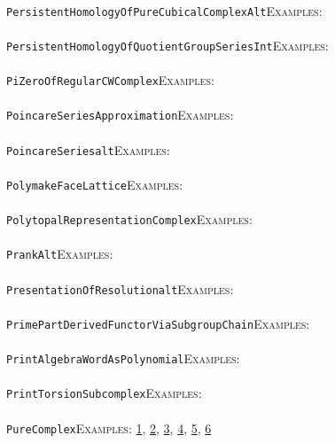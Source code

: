 \documentclass[a4paper,11pt]{report}
\begin{document}
{{ \\
 \texttt{PersistentHomologyOfPureCubicalComplex{\textunderscore}Alt}{\nobreakspace}{\nobreakspace}{\nobreakspace}{\nobreakspace}\textsc{Examples:} \\
 \\
 \texttt{PersistentHomologyOfQuotientGroupSeries{\textunderscore}Int}{\nobreakspace}{\nobreakspace}{\nobreakspace}{\nobreakspace}\textsc{Examples:} \\
 \\
 \texttt{PiZeroOfRegularCWComplex}{\nobreakspace}{\nobreakspace}{\nobreakspace}{\nobreakspace}\textsc{Examples:} \\
 \\
 \texttt{PoincareSeriesApproximation}{\nobreakspace}{\nobreakspace}{\nobreakspace}{\nobreakspace}\textsc{Examples:} \\
 \\
 \texttt{PoincareSeries{\textunderscore}alt}{\nobreakspace}{\nobreakspace}{\nobreakspace}{\nobreakspace}\textsc{Examples:} \\
 \\
 \texttt{PolymakeFaceLattice}{\nobreakspace}{\nobreakspace}{\nobreakspace}{\nobreakspace}\textsc{Examples:} \\
 \\
 \texttt{PolytopalRepresentationComplex}{\nobreakspace}{\nobreakspace}{\nobreakspace}{\nobreakspace}\textsc{Examples:} \\
 \\
 \texttt{PrankAlt}{\nobreakspace}{\nobreakspace}{\nobreakspace}{\nobreakspace}\textsc{Examples:} \\
 \\
 \texttt{PresentationOfResolution{\textunderscore}alt}{\nobreakspace}{\nobreakspace}{\nobreakspace}{\nobreakspace}\textsc{Examples:} \\
 \\
 \texttt{PrimePartDerivedFunctorViaSubgroupChain}{\nobreakspace}{\nobreakspace}{\nobreakspace}{\nobreakspace}\textsc{Examples:} \\
 \\
 \texttt{PrintAlgebraWordAsPolynomial}{\nobreakspace}{\nobreakspace}{\nobreakspace}{\nobreakspace}\textsc{Examples:} \\
 \\
 \texttt{PrintTorsionSubcomplex}{\nobreakspace}{\nobreakspace}{\nobreakspace}{\nobreakspace}\textsc{Examples:} \\
 \\
 \texttt{PureComplex}{\nobreakspace}{\nobreakspace}{\nobreakspace}{\nobreakspace}\textsc{Examples:} \href{tutorial/chap2.html} {1}{\nobreakspace}, \href{tutorial/chap3.html} {2}{\nobreakspace}, \href{../www/SideLinks/About/aboutPeripheral.html} {3}{\nobreakspace}, \href{../www/SideLinks/About/aboutCoveringSpaces.html} {4}{\nobreakspace}, \href{../www/SideLinks/About/aboutCoverinSpaces.html} {5}{\nobreakspace}, \href{../www/SideLinks/About/aboutCubical.html} {6}{\nobreakspace} \\
}}
\end{document}
